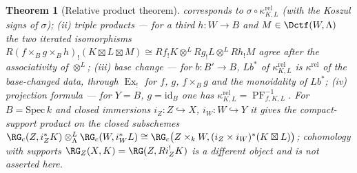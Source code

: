 \documentclass[11pt]{article}
\theoremstyle{plain}
\newtheorem{theorem}{Theorem}[section]
\theoremstyle{definition}
\begin{document}
\begin{theorem}[Relative product theorem]
corresponds to $\sigma\circ\kappa^{\mathrm{rel}}_{K,L}$ (with the Koszul
signs of $\sigma$); (ii) \emph{triple products} --- for a third
$h:W\to B$ and $M\in\Dctf(W,\Lambda)$ the two iterated isomorphisms
$R(f\times_Bg\times_Bh)_!(K\boxtimes L\boxtimes M)\cong
Rf_!K\otimes^LRg_!L\otimes^LRh_!M$ agree after the associativity of
$\otimes^L$; (iii) \emph{base change} --- for $b:B'\to B$, $Lb^*$ of
$\kappa^{\mathrm{rel}}_{K,L}$ is $\kappa^{\mathrm{rel}}$ of the base-changed
data, through $\operatorname{Ex}_!$ for $f$, $g$, $f\times_Bg$ and the
monoidality of $Lb^*$; (iv) \emph{projection formula} --- for $Y=B$,
$g=\mathrm{id}_B$ one has $\kappa^{\mathrm{rel}}_{K,L}=
\operatorname{PF}_{f,K,L}^{-1}$.  For $B=\mathrm{Spec}\,k$ and closed
immersions $i_Z:Z\hookrightarrow X$, $i_W:W\hookrightarrow Y$ it gives the
compact-support product on the closed subschemes
$\RG_c(Z,i_Z^*K)\otimes^L_\Lambda\RG_c(W,i_W^*L)\cong
\RG_c\bigl(Z\times_kW,(i_Z\times i_W)^*(K\boxtimes L)\bigr)$; cohomology with
supports $\RG_Z(X,K)=\RG(Z,Ri_Z^!K)$ is a different object and is not
asserted here.
\end{theorem}
\end{document}
